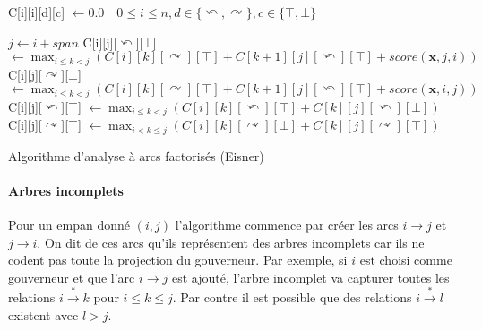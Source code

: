 \documentclass[11pt,openany]{book}
\begin{document}
\begin{algorithm}[htbp]

\scriptsize
\begin{algorithmic}[0]
\State C[i][i][d][c] $\gets 0.0 \quad 0 \leq i \leq n, d\in
\{\curvearrowleft, \curvearrowright\}, c \in \{\top,\bot \}$ 

     \State $j \gets i + span$
     \State{}
     \State C[i][j][$\curvearrowleft$][$\bot$] $\gets
     \mathop{\text{max}}_{i\leq k < j}(C[i][k][\curvearrowright][\top]
     + C[k+1][j][\curvearrowleft][\top] + score(\mathbf{x},j,i))$
     \State C[i][j][$\curvearrowright$][$\bot$] $\gets \mathop{\text{max}}_{i\leq k < j}(C[i][k][\curvearrowright][\top] + C[k+1][j][\curvearrowleft][\top] + score(\mathbf{x},i,j))$ 
     \State{}
     \State C[i][j][$\curvearrowleft$][$\top$] $\gets \mathop{\text{max}}_{i\leq k < j}(C[i][k][\curvearrowleft][\top] + C[k][j][\curvearrowleft][\bot])$     
     \State C[i][j][$\curvearrowright$][$\top$] $\gets \mathop{\text{max}}_{i < k \leq j}(C[i][k][\curvearrowright][\bot] + C[k][j][\curvearrowright][\top])$     

 \EndFor
\EndFor
\EndFunction
\end{algorithmic}

\caption{\label{algo-eisner}Algorithme d'analyse à arcs factorisés (Eisner)}
\end{algorithm}



\paragraph{Arbres incomplets}
Pour un empan donné $(i,j)$ l'algorithme commence par créer les arcs
$i\rightarrow j$ et $j\rightarrow i$. On dit de ces arcs qu'ils
représentent des arbres incomplets car ils ne codent pas toute la
projection du gouverneur. Par exemple, si $i$ est choisi comme
gouverneur et que l'arc $i\rightarrow j$ est ajouté,
l'arbre incomplet va capturer toutes les relations 
$i \stackrel{*}{\rightarrow} k$ pour $i\leq k \leq j$. Par contre il
est possible que des relations $i \stackrel{*}{\rightarrow} l$
existent avec $l > j$. 
\end{document}
